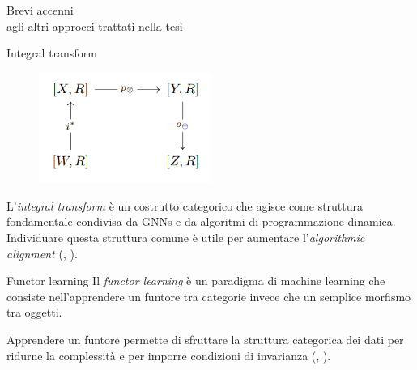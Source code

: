 \documentclass{beamer}
\begin{document}
\begin{frame}[standout]
    \huge Brevi accenni \\\large agli altri approcci trattati nella tesi
\end{frame}

\begin{frame}{Integral transform}

    \begin{figure}
        \begin{center}
            \includegraphics[width=0.5\textwidth]{figures/integral_transform.png}
            \caption*{\cite{dudzik2022graph}}
        \end{center}
    \end{figure}

    L'\textit{integral transform} è un costrutto categorico che agisce come struttura fondamentale condivisa da GNNs e da algoritmi di programmazione dinamica. Individuare questa struttura comune è utile per aumentare l'\textit{algorithmic alignment} (\cite{dudzik2022graph}, \cite{dudzik2024asynchronous}). 
\end{frame}

\begin{frame}{Functor learning}
    Il \textit{functor learning} è un paradigma di machine learning che consiste nell'apprendere un funtore tra categorie invece che un semplice morfismo tra oggetti.

    Apprendere un funtore permette di sfruttare la struttura categorica dei dati per ridurne la complessità e per imporre condizioni di invarianza (\cite{sheshmani2021categorical}, \cite{chytas2024poolingimagedatasetsmultiple}).
\end{frame}
\end{document}
